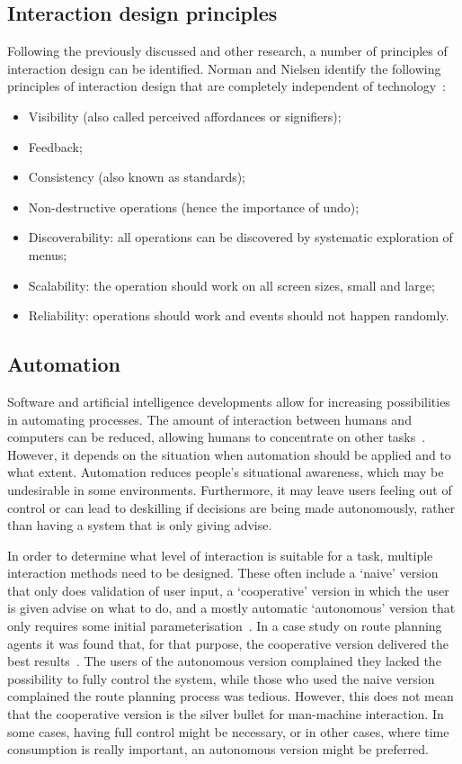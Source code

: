 \subsection[Principles]{Interaction design principles}
Following the previously discussed and other research, a number of principles of interaction design can be identified.
Norman and Nielsen identify the following principles of interaction design that are completely independent of technology~\cite{norman2010gestural}:
\begin{itemize}[noitemsep,topsep=0pt,parsep=0pt,partopsep=0pt]
\item Visibility (also called perceived affordances or signifiers);
\item Feedback;
\item Consistency (also known as standards);
\item Non-destructive operations (hence the importance of undo);
\item Discoverability: all operations can be discovered by systematic exploration of menus;
\item Scalability: the operation should work on all screen sizes, small and large;
\item Reliability: operations should work and events should not happen randomly.
\end{itemize}

\subsection{Automation}
Software and artificial intelligence developments allow for increasing possibilities in automating processes. The amount of interaction between humans and computers can be reduced, allowing humans to concentrate on other tasks~\cite{payne2000varying}. However, it depends on the situation when automation should be applied and to what extent. Automation reduces people's situational awareness, which may be undesirable in some environments. Furthermore, it may leave users feeling out of control or can lead to deskilling if decisions are being made autonomously, rather than having a system that is only giving advise.

In order to determine what level of interaction is suitable for a task, multiple interaction methods need to be designed. These often include a `naive' version that only does validation of user input, a `cooperative' version in which the user is given advise on what to do, and a mostly automatic `autonomous' version that only requires some initial parameterisation~\cite{payne2000varying,horvitz1999principles}. In a case study on route planning agents it was found that, for that purpose, the cooperative version delivered the best results~\cite{payne2000varying}. The users of the autonomous version complained they lacked the possibility to fully control the system, while those who used the naive version complained the route planning process was tedious. However, this does not mean that the cooperative version is the silver bullet for man-machine interaction. In some cases, having full control might be necessary, or in other cases, where time consumption is really important, an autonomous version might be preferred.

